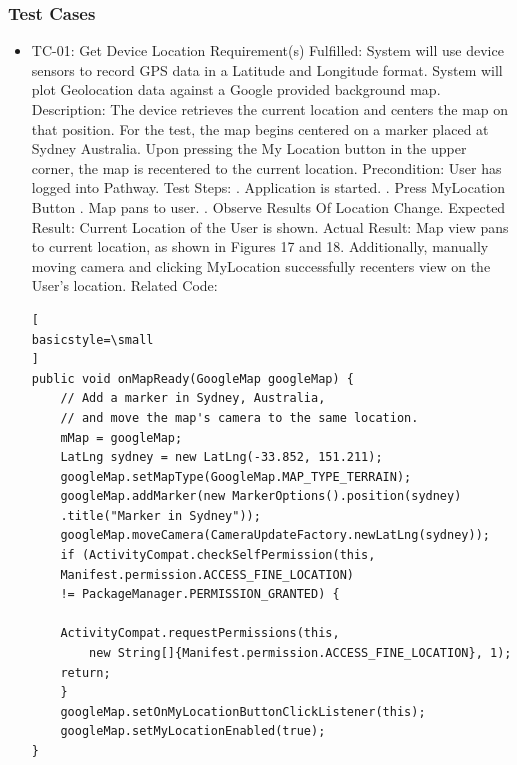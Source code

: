 \documentclass{article}
\begin{document}
\subsubsection{Test Cases}
\begin {itemize}
\item TC-01: Get Device Location
\subitem Requirement(s) Fulfilled:
\subsubitem System will use device sensors to record GPS data in a Latitude and Longitude format.
\subsubitem System will plot Geolocation data against a Google provided background map.
\subitem Description: The device retrieves the current location and centers the map on that position. For the test, the map begins centered on a marker placed at Sydney Australia. Upon pressing the My Location button in the upper corner, the map is recentered to the current location.
\subitem Precondition: User has logged into Pathway.
\subitem Test Steps:
. Application is started.
. Press MyLocation Button
. Map pans to user.
. Observe Results Of Location Change.
\subitem Expected Result: Current Location of the User is shown.
\subitem Actual Result: Map view pans to current location, as shown in Figures 17 and 18.
\subsubitem Additionally, manually moving camera and clicking MyLocation successfully recenters view on the User's location.
\subitem Related Code:
\begin{lstlisting}[
basicstyle=\small
]
public void onMapReady(GoogleMap googleMap) {
    // Add a marker in Sydney, Australia,
    // and move the map's camera to the same location.
    mMap = googleMap;
    LatLng sydney = new LatLng(-33.852, 151.211);
    googleMap.setMapType(GoogleMap.MAP_TYPE_TERRAIN);
    googleMap.addMarker(new MarkerOptions().position(sydney)
    .title("Marker in Sydney"));
    googleMap.moveCamera(CameraUpdateFactory.newLatLng(sydney));
    if (ActivityCompat.checkSelfPermission(this,
    Manifest.permission.ACCESS_FINE_LOCATION)
    != PackageManager.PERMISSION_GRANTED) {

    ActivityCompat.requestPermissions(this,
        new String[]{Manifest.permission.ACCESS_FINE_LOCATION}, 1);
    return;
    }
    googleMap.setOnMyLocationButtonClickListener(this);
    googleMap.setMyLocationEnabled(true);
}
\end{lstlisting}



\end{itemize}
\end{document}
